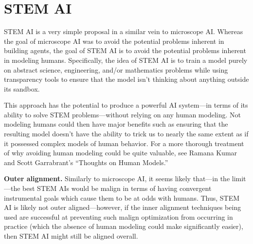 \section{STEM AI}
\label{sec:6}

STEM AI is a very simple proposal in a similar vein to microscope AI. Whereas the goal of microscope AI was to avoid the potential problems inherent in building agents, the goal of STEM AI is to avoid the potential problems inherent in modeling humans. Specifically, the idea of STEM AI is to train a model purely on abstract science, engineering, and/or mathematics problems while using transparency tools to ensure that the model isn't thinking about anything outside its sandbox.

This approach has the potential to produce a powerful AI system---in terms of its ability to solve STEM problems---without relying on any human modeling. Not modeling humans could then have major benefits such as ensuring that the resulting model doesn't have the ability to trick us to nearly the same extent as if it possessed complex models of human behavior. For a more thorough treatment of why avoiding human modeling could be quite valuable, see Ramana Kumar and Scott Garrabrant's ``Thoughts on Human Models\cite{TODO: cite https://www.alignmentforum.org/posts/BKjJJH2cRpJcAnP7T/thoughts-on-human-models}.''

\textbf{Outer alignment.} Similarly to microscope AI, it seems likely that---in the limit---the best STEM AIs would be malign in terms of having convergent instrumental goals which cause them to be at odds with humans. Thus, STEM AI is likely not outer aligned---however, if the inner alignment techniques being used are successful at preventing such malign optimization from occurring in practice (which the absence of human modeling could make significantly easier), then STEM AI might still be aligned overall.

